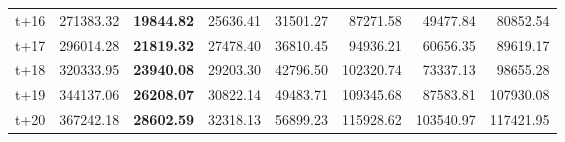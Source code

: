 \begin{table}[H]
\begin{tabular}{lrrrrrrr}
t+16  & 271383.32  & \textbf{19844.82}  & 25636.41  & 31501.27  & 87271.58  & 49477.84  & 80852.54  \\
t+17  & 296014.28  & \textbf{21819.32}  & 27478.40  & 36810.45  & 94936.21  & 60656.35  & 89619.17  \\
t+18  & 320333.95  & \textbf{23940.08}  & 29203.30  & 42796.50  & 102320.74  & 73337.13  & 98655.28  \\
t+19  & 344137.06  & \textbf{26208.07}  & 30822.14  & 49483.71  & 109345.68  & 87583.81  & 107930.08  \\
t+20  & 367242.18  & \textbf{28602.59}  & 32318.13  & 56899.23  & 115928.62  & 103540.97  & 117421.95  \\

\bottomrule
\end{tabular}
\end{table}
